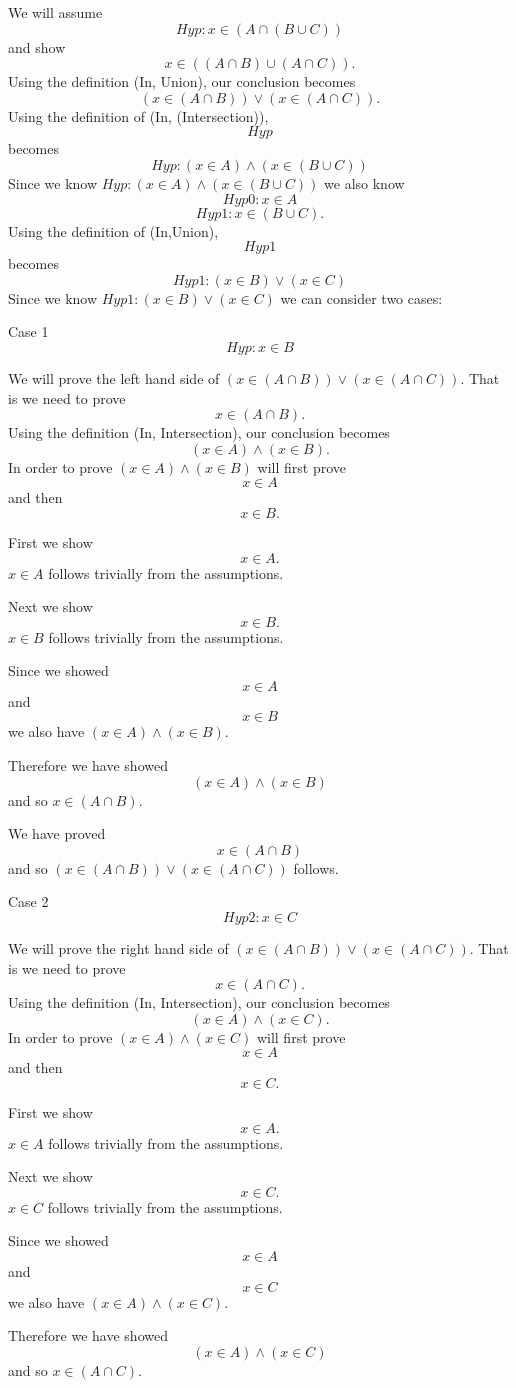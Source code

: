 \documentclass[11pt, oneside]{article}
\begin{document}
 We will assume $$Hyp : x \in (A \cap (B \cup C)) $$ and show $$x \in ((A \cap B) \cup (A \cap C)) .$$Using the definition (In, Union), our conclusion becomes $$(x \in (A \cap B)) \lor (x \in (A \cap C)) .$$Using the definition of (In, (Intersection)), $$Hyp $$ becomes $$Hyp : (x \in A) \land (x \in (B \cup C)) $$ Since we know $Hyp : (x \in A) \land (x \in (B \cup C)) $ we also know $$Hyp0 : x \in A $$ $$Hyp1 : x \in (B \cup C) .$$Using the definition of (In,Union), $$Hyp1 $$ becomes $$Hyp1 : (x \in B) \lor (x \in C) $$ Since we know $Hyp1 : (x \in B) \lor (x \in C) $ we can consider two cases: 

 Case 1 $$Hyp : x \in B $$

 We will prove the left hand side of $(x \in (A \cap B)) \lor (x \in (A \cap C)) $. That is we need to prove $$x \in (A \cap B) .$$ Using the definition (In, Intersection), our conclusion becomes $$(x \in A) \land (x \in B) .$$In order to prove $(x \in A) \land (x \in B) $ will first prove $$x \in A $$ and then $$x \in B .$$

 First we show $$x \in A .$$ $x \in A $ follows trivially from the assumptions.

 Next we show $$x \in B .$$ $x \in B $ follows trivially from the assumptions.

 Since we showed $$x \in A $$ and $$x \in B $$ we also have $(x \in A) \land (x \in B) $.

 Therefore we have showed $$(x \in A) \land (x \in B) $$ and so $x \in (A \cap B) $.

 We have proved $$x \in (A \cap B) $$ and so $(x \in (A \cap B)) \lor (x \in (A \cap C)) $ follows.

 

 Case 2 $$Hyp2 : x \in C $$

 We will prove the right hand side of $(x \in (A \cap B)) \lor (x \in (A \cap C)) $. That is we need to prove $$x \in (A \cap C) .$$ Using the definition (In, Intersection), our conclusion becomes $$(x \in A) \land (x \in C) .$$In order to prove $(x \in A) \land (x \in C) $ will first prove $$x \in A $$ and then $$x \in C .$$

 First we show $$x \in A .$$ $x \in A $ follows trivially from the assumptions.

 Next we show $$x \in C .$$ $x \in C $ follows trivially from the assumptions.

 Since we showed $$x \in A $$ and $$x \in C $$ we also have $(x \in A) \land (x \in C) $.

 Therefore we have showed $$(x \in A) \land (x \in C) $$ and so $x \in (A \cap C) $.
\end{document}
